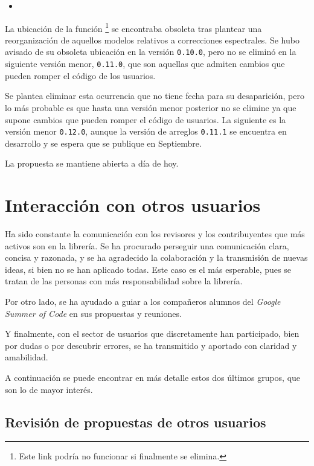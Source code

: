 \begin{itemize}
    \item {}
\end{itemize}

La ubicación de la función \footnote{Este link podría no funcionar si finalmente se elimina.} se encontraba obsoleta tras plantear una reorganización de aquellos modelos relativos a correcciones espectrales. Se hubo avisado de su obsoleta ubicación en la versión \texttt{0.10.0}, pero no se eliminó en la siguiente versión menor, \texttt{0.11.0}, que son aquellas que admiten cambios que pueden romper el código de los usuarios.

Se plantea eliminar esta ocurrencia que no tiene fecha para su desaparición, pero lo más probable es que hasta una versión menor posterior no se elimine ya que supone cambios que pueden romper el código de usuarios. La siguiente es la versión menor \texttt{0.12.0}, aunque la versión de arreglos \texttt{0.11.1} se encuentra en desarrollo y se espera que se publique en Septiembre.

La propuesta se mantiene abierta a día de hoy.



\section{Interacción con otros usuarios}

Ha sido constante la comunicación con los revisores y los contribuyentes que más activos son en la librería. Se ha procurado perseguir una comunicación clara, concisa y razonada, y se ha agradecido la colaboración y la transmisión de nuevas ideas, si bien no se han aplicado todas. Este caso es el más esperable, pues se tratan de las personas con más responsabilidad sobre la librería.

Por otro lado, se ha ayudado a guiar a los compañeros alumnos del \textit{Google Summer of Code} en sus propuestas y reuniones.

Y finalmente, con el sector de usuarios que discretamente han participado, bien por dudas o por descubrir errores, se ha transmitido y aportado con claridad y amabilidad.

A continuación se puede encontrar en más detalle estos dos últimos grupos, que son lo de mayor interés.

\subsection{Revisión de propuestas de otros usuarios}

